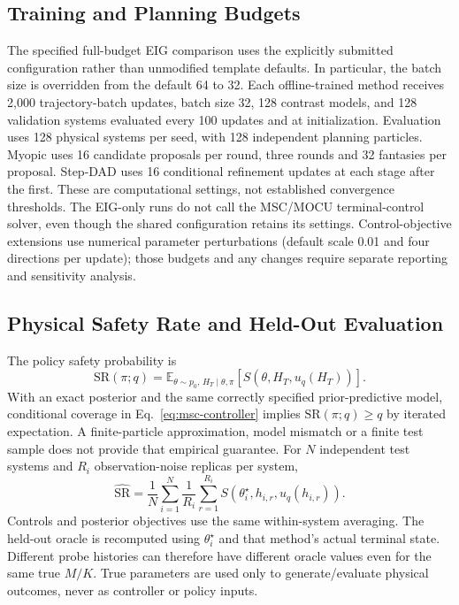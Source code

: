 \documentclass[journal]{IEEEtran}
\newcommand{\E}{\mathbb E}
\begin{document}
\subsection{Training and Planning Budgets}
The specified full-budget EIG comparison uses the explicitly submitted
configuration rather than unmodified template defaults. In particular, the
batch size is overridden from the default 64 to 32. Each offline-trained
method receives 2,000 trajectory-batch updates,
batch size 32, 128 contrast models, and 128 validation systems evaluated every
100 updates and at initialization. Evaluation uses 128 physical systems per
seed, with 128 independent planning particles. Myopic uses 16 candidate
proposals per round, three rounds and 32 fantasies per proposal. Step-DAD uses
16 conditional refinement updates at each stage after the first. These are
computational settings, not established convergence thresholds. The EIG-only
runs do not call the MSC/MOCU terminal-control solver, even though the shared
configuration retains its settings. Control-objective extensions use numerical
parameter perturbations (default scale 0.01 and four directions per update);
those budgets and any changes require separate reporting and sensitivity
analysis.

\subsection{Physical Safety Rate and Held-Out Evaluation}
The policy safety probability is
\begin{equation}
\mathrm{SR}(\pi;q)=\E_{\theta\sim p_0,\,H_T\mid\theta,\pi}
[S(\theta,H_T,u_q(H_T))].
\label{eq:safety-rate}
\end{equation}
With an exact posterior and the same correctly specified prior-predictive
model, conditional coverage in Eq.~\eqref{eq:msc-controller} implies
$\mathrm{SR}(\pi;q)\ge q$ by iterated expectation. A finite-particle
approximation, model mismatch or a finite test sample does not provide that
empirical guarantee.
For $N$ independent test systems and $R_i$ observation-noise replicas per system,
\begin{equation}
\widehat{\mathrm{SR}}=\frac1N\sum_{i=1}^N\frac1{R_i}
\sum_{r=1}^{R_i}S(\theta_i^\star,h_{i,r},u_q(h_{i,r})).
\label{eq:empirical-safety}
\end{equation}
Controls and posterior objectives use the same within-system averaging.
The held-out oracle is recomputed using $\theta_i^\star$ and that method's
actual terminal state. Different probe histories can therefore have different
oracle values even for the same true $M/K$. True parameters are used only
to generate/evaluate physical outcomes, never as controller or policy inputs.
\end{document}
